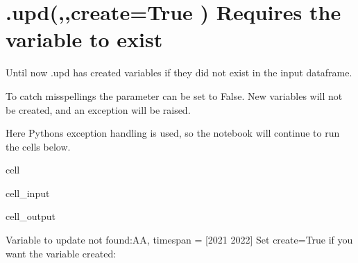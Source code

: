 \documentclass[letterpaper,10pt,english]{jupyterBook}
\begin{document}
\section{.upd(,,create=True ) Requires the variable to exist}
\label{\detokenize{content/04_PythonEssentials/UpdateCommand:upd-create-true-requires-the-variable-to-exist}}
\sphinxAtStartPar
Until now .upd has created variables if they did not exist in the input dataframe.

\sphinxAtStartPar
To catch misspellings the parameter  can be set to False.
New variables will not be created, and an exception will be raised.

\sphinxAtStartPar
Here Pythons exception handling is used, so the notebook will continue to run the cells below.

\begin{sphinxuseclass}{cell}\begin{sphinxVerbatimInput}

\begin{sphinxuseclass}{cell_input}
\begin{sphinxVerbatim}[commandchars=\\\{\}]
      
   
      
\end{sphinxVerbatim}

\end{sphinxuseclass}\end{sphinxVerbatimInput}
\begin{sphinxVerbatimOutput}

\begin{sphinxuseclass}{cell_output}
\begin{sphinxVerbatim}[commandchars=\\\{\}]
Variable to update not found:AA, timespan = [2021 2022] 
Set create=True if you want the variable created: 
\end{sphinxVerbatim}

\end{sphinxuseclass}\end{sphinxVerbatimOutput}

\end{sphinxuseclass}
\sphinxstepscope
\end{document}
